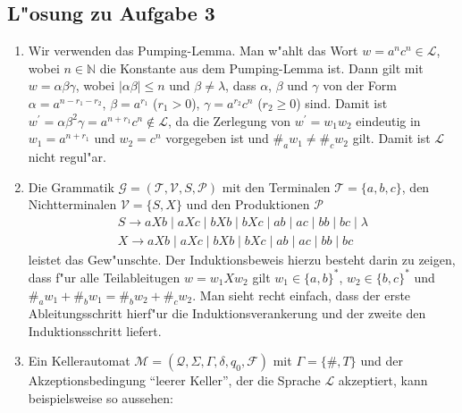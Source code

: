 \documentclass[10pt,oneside,onecolumn,a4paper,german,titlepage]{article}
\begin{document}
\subsection*{L"osung zu Aufgabe 3}
\begin{enumerate}
\item Wir verwenden das Pumping-Lemma. Man w"ahlt das Wort $w = a^nc^n \in
\mathcal{L}$, wobei $n \in \mathbb{N}$ die Konstante aus dem Pumping-Lemma ist. Dann
gilt mit $w = \alpha\beta\gamma$, wobei $|\alpha\beta| \leq n$ und $\beta \not=
\lambda$, dass $\alpha$, $\beta$ und $\gamma$ von der Form $\alpha = a^{n-r_1-r_2}$,
$\beta = a^{r_1}$ ($r_1 > 0$), $\gamma = a^{r_2}c^n$ ($r_2 \geq 0$) sind. Damit ist
$w^\prime = \alpha\beta^2\gamma = a^{n+r_1}c^n \notin \mathcal{L}$, da die Zerlegung
von $w^\prime = w_1w_2$ eindeutig in $w_1 = a^{n+r_1}$ und $w_2 = c^{n}$ vorgegeben
ist und $\#_a w_1 \neq \#_c w_2$ gilt. Damit ist $\mathcal{L}$ nicht regul"ar.
\item Die Grammatik $\mathcal{G} = (\mathcal{T},\mathcal{V},S,\mathcal{P})$ mit den
Terminalen $\mathcal{T} = \{a,b,c\}$, den Nichtterminalen $\mathcal{V} = \{S,X\}$
und den Produktionen $\mathcal{P}$
\begin{eqnarray*}
S \rightarrow aXb \; | \; aXc \; | \; bXb \; | \; bXc \; | \; ab \; | \; ac \; | \;
bb \; | \; bc \; | \; \lambda \\
X \rightarrow aXb \; | \; aXc \; | \; bXb \; | \; bXc \; | \; ab \; | \; ac \; | \;
bb \; | \; bc
\end{eqnarray*}
leistet das Gew"unschte. Der Induktionsbeweis hierzu besteht darin zu zeigen, dass
f"ur alle Teilableitugen $w = w_1Xw_2$ gilt $w_1 \in \{a,b\}^*$, $w_2 \in \{b,c\}^*$
und $\#_a w_1 + \#_b w_1 = \#_b w_2 + \#_c w_2$. Man sieht recht einfach, dass der
erste Ableitungsschritt hierf"ur die Induktionsverankerung und der zweite den
Induktionsschritt liefert.
\item Ein Kellerautomat $\mathcal{M} = (\mathcal{Q},\Sigma,\Gamma,\delta,q_0,
\mathcal{F})$ mit $\Gamma = \{\#,T\}$ und der Akzeptionsbedingung ``leerer Keller'',
der die Sprache $\mathcal{L}$ akzeptiert, kann beispielsweise so aussehen:
\begin{center}
\end{center}
\end{enumerate}
\end{document}
